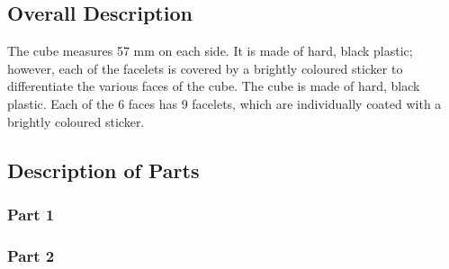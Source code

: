 \subsection{Overall Description}
The cube measures 57 mm on each side. It is made of hard, black plastic; however, each of the facelets is covered by a brightly coloured sticker to differentiate the various faces of the cube. 
The cube is made of hard, black plastic. Each of the 6 faces has 9 facelets, which are individually coated with a brightly coloured sticker. 
\subsection{Description of Parts}
	\subsubsection{Part 1}
	\subsubsection{Part 2}	